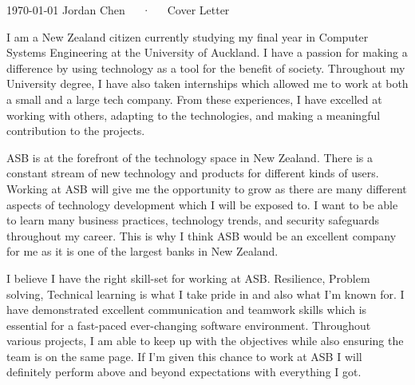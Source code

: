 \documentclass[11pt, a4paper]{awesome-cv}
\begin{document}
\makecvheader[L]

\makecvfooter
  {\today}
  {Jordan Chen~~~·~~~Cover Letter}
  {}

\makelettertitle

\begin{cvletter}

I am a New Zealand citizen currently studying my final year in Computer Systems Engineering at the University of Auckland. I have a passion for making a difference by using technology as a tool for the benefit of society. Throughout my University degree, I have also taken internships which allowed me to work at both a small and a large tech company. From these experiences, I have excelled at working with others, adapting to the technologies, and making a meaningful contribution to the projects.

ASB is at the forefront of the technology space in New Zealand. There is a constant stream of new technology and products for different kinds of users. Working at ASB will give me the opportunity to grow as there are many different aspects of technology development which I will be exposed to. I want to be able to learn many business practices, technology trends, and security safeguards throughout my career. This is why I think ASB would be an excellent company for me as it is one of the largest banks in New Zealand.

I believe I have the right skill-set for working at ASB. Resilience, Problem solving, Technical learning is what I take pride in and also what I'm known for. I have demonstrated excellent communication and teamwork skills which is essential for a fast-paced ever-changing software environment. Throughout various projects, I am able to keep up with the objectives while also ensuring the team is on the same page. If I'm given this chance to work at ASB I will definitely perform above and beyond expectations with everything I got.

\end{cvletter}


\makeletterclosing
\end{document}
